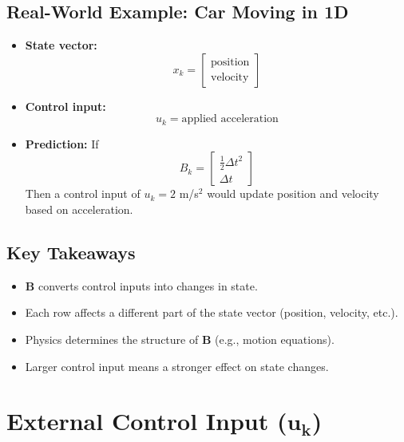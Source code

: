 \documentclass{article}
\begin{document}
\subsection*{Real-World Example: Car Moving in 1D}
\begin{itemize}
    \item \textbf{State vector:}  
    \[
    x_k =
    \begin{bmatrix}
    \text{position} \\
    \text{velocity}
    \end{bmatrix}
    \]
    \item \textbf{Control input:}  
    \[
    u_k = \text{applied acceleration}
    \]
    \item \textbf{Prediction:}  
    If 
    \[
    B_k =
    \begin{bmatrix}
    \frac{1}{2} \Delta t^2 \\
    \Delta t
    \end{bmatrix}
    \]
    Then a control input of \( u_k = 2 \) m/s\(^2\) would update position and velocity based on acceleration.
\end{itemize}

\subsection*{Key Takeaways}
\begin{itemize}
    \item {} \(\mathbf{B}\) converts control inputs into changes in state.
    \item {} Each row affects a different part of the state vector (position, velocity, etc.).
    \item {} Physics determines the structure of \(\mathbf{B}\) (e.g., motion equations).
    \item {} Larger control input means a stronger effect on state changes.
\end{itemize}

\newpage

\section{External Control Input (\(\mathbf{u_k}\))}
\end{document}
